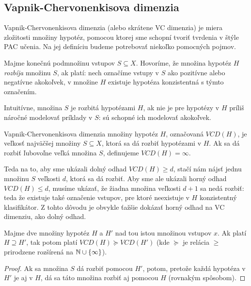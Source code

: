 \subsection{Vapnik-Chervonenkisova dimenzia}

Vapnik-Chervonenkisova dimenzia (alebo skrátene VC dimenzia) je miera
zložitosti množiny hypotéz, pomocou ktorej sme schopní tvoriť tvrdenia
v štýle PAC učenia. Na jej definíciu budeme potrebovať niekoľko pomocných
pojmov.

\begin{definition}
  Majme konečnú podmnožinu vstupov $S \subseteq X$. Hovoríme, že množina
  hypotéz $H$ \emph{rozbíja} množinu $S$, ak platí: nech označíme vstupy
  v $S$ ako pozitívne alebo negatívne akokoľvek, v množine $H$ existuje
  hypotéza konzistentná s týmto označením.
\end{definition}

Intuitívne, množina $S$ je rozbitá hypotézami $H$, ak nie je pre
hypotézy v $H$ príliš náročné modelovať príklady v $S$: sú schopné
ich modelovať akokoľvek.

\begin{definition}
  Vapnik-Chervonenkisova dimenzia množiny hypotéz $H$, označovaná
  $VCD(H)$, je veľkosť najväčšej množiny $S \subseteq X$, ktorá
  sa dá rozbiť hypotézami v $H$. Ak sa dá rozbiť ľubovoľne veľká
  množina $S$, definujeme $VCD(H) = \infty$.
\end{definition}

Teda na to, aby sme ukázali dolný odhad $VCD(H) \geq d$, stačí nám
nájsť jednu množinu $S$ veľkosti $d$, ktorá sa dá rozbiť. Aby sme ale
ukázali horný odhad $VCD(H) \leq d$, musíme ukázať, že žiadna množina
veľkosti $d + 1$ sa nedá rozbiť: teda že existuje také označenie vstupov,
pre ktoré neexistuje v $H$ konzistentný klasifikátor. Z tohto dôvodu je
obvykle ťažšie dokázať horný odhad na VC dimenziu, ako dolný odhad.

\begin{lemma}
  Majme dve množiny hypotéz $H$ a $H'$ nad tou istou množinou vstupov $x$.
  Ak platí $H \supseteq H'$, tak potom platí $VCD(H) \succeq VCD(H')$ (kde
  $\succeq$ je relácia $\geq$ prirodzene rozšírená na $\mathbb{N} \cup \{ \infty \}$).
\end{lemma}
\begin{proof}
  Ak sa množina $S$ dá rozbiť pomocou $H'$, potom, pretože každá hypotéza
  v $H'$ je aj v $H$, dá sa táto množina rozbiť aj pomocou $H$ (rovnakým
  spôsobom).
\end{proof}

